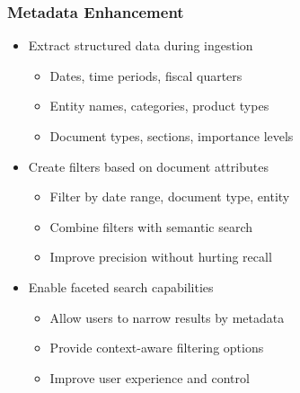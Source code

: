 {    \begin{frame}
        \frametitle{Metadata Enhancement}
        \begin{itemize}
            \item Extract structured data during ingestion
            \begin{itemize}
                \item Dates, time periods, fiscal quarters
                \item Entity names, categories, product types
                \item Document types, sections, importance levels
            \end{itemize}
            \item Create filters based on document attributes
            \begin{itemize}
                \item Filter by date range, document type, entity
                \item Combine filters with semantic search
                \item Improve precision without hurting recall
            \end{itemize}
            \item Enable faceted search capabilities
            \begin{itemize}
                \item Allow users to narrow results by metadata
                \item Provide context-aware filtering options
                \item Improve user experience and control
            \end{itemize}
        \end{itemize}
    \end{frame}

}
